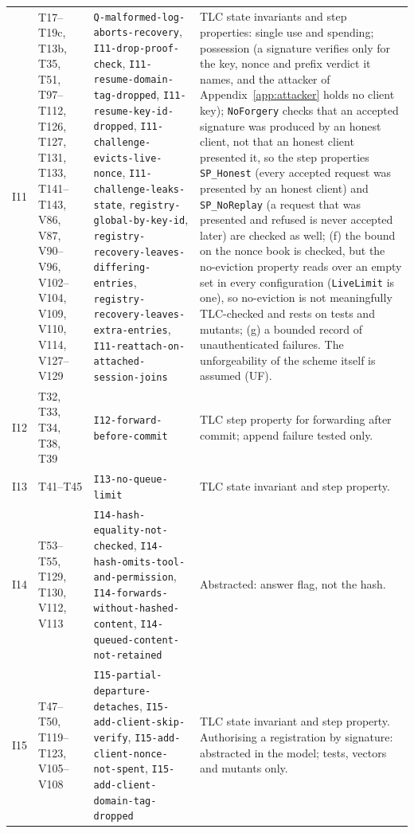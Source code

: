 \begin{table}[htbp]
\begin{tabularx}{\columnwidth}{l l X X}
I11 & T17--T19c, T13b, T35, T51, T97--T112, T126, T127, T131, T133, T141--T143, V86, V87, V90--V96, V102--V104, V109, V110, V114, V127--V129 & \texttt{Q-malformed-log-aborts-recovery}, \texttt{I11-drop-proof-check}, \texttt{I11-resume-domain-tag-dropped}, \texttt{I11-resume-key-id-dropped}, \texttt{I11-challenge-evicts-live-nonce}, \texttt{I11-challenge-leaks-state}, \texttt{registry-global-by-key-id}, \texttt{registry-recovery-leaves-differing-entries}, \texttt{registry-recovery-leaves-extra-entries}, \texttt{I11-reattach-on-attached-session-joins} & TLC state invariants and step properties: single use and spending; possession (a signature verifies only for the key, nonce and prefix verdict it names, and the attacker of Appendix~\ref{app:attacker} holds no client key); \texttt{NoForgery} checks that an accepted signature was produced by an honest client, not that an honest client presented it, so the step properties \texttt{SP\_Honest} (every accepted request was presented by an honest client) and \texttt{SP\_NoReplay} (a request that was presented and refused is never accepted later) are checked as well; (f) the bound on the nonce book is checked, but the no-eviction property reads over an empty set in every configuration (\texttt{LiveLimit} is one), so no-eviction is not meaningfully TLC-checked and rests on tests and mutants; (g) a bounded record of unauthenticated failures. The unforgeability of the scheme itself is assumed (UF). \\
I12 & T32, T33, T34, T38, T39 & \texttt{I12-forward-before-commit} & TLC step property for forwarding after commit; append failure tested only. \\
I13 & T41--T45 & \texttt{I13-no-queue-limit} & TLC state invariant and step property. \\
I14 & T53--T55, T129, T130, V112, V113 & \texttt{I14-hash-equality-not-checked}, \texttt{I14-hash-omits-tool-and-permission}, \texttt{I14-forwards-without-hashed-content}, \texttt{I14-queued-content-not-retained} & Abstracted: answer flag, not the hash. \\
I15 & T47--T50, T119--T123, V105--V108 & \texttt{I15-partial-departure-detaches}, \texttt{I15-add-client-skip-verify}, \texttt{I15-add-client-nonce-not-spent}, \texttt{I15-add-client-domain-tag-dropped} & TLC state invariant and step property. Authorising a registration by signature: abstracted in the model; tests, vectors and mutants only. \\

\end{tabularx}
\end{table}
